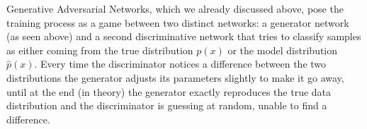 Generative Adversarial Networks, which we already discussed above, pose the training process as a game between two distinct networks: a generator network (as seen above) and a second discriminative network that tries to classify samples as either coming from the true distribution $p(x)$ or the model distribution $\hat{p}(x)$. Every time the discriminator notices a difference between the two distributions the generator adjusts its parameters slightly to make it go away, until at the end (in theory) the generator exactly reproduces the true data distribution and the discriminator is guessing at random, unable to find a difference.


